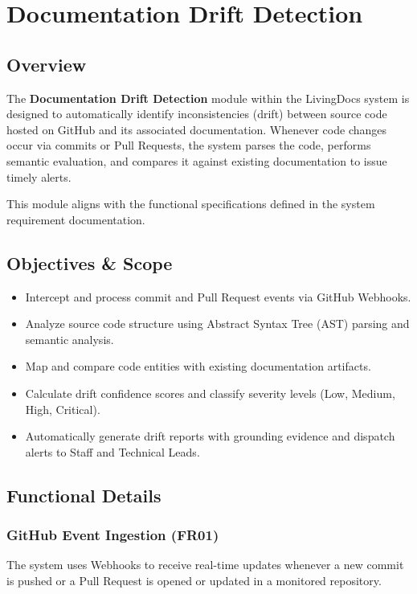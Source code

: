 \section{Documentation Drift Detection}

\subsection{Overview}
The \textbf{Documentation Drift Detection} module within the LivingDocs system is designed to automatically identify inconsistencies (drift) between source code hosted on GitHub and its associated documentation. Whenever code changes occur via commits or Pull Requests, the system parses the code, performs semantic evaluation, and compares it against existing documentation to issue timely alerts.

This module aligns with the functional specifications defined in the system requirement documentation.

\subsection{Objectives \& Scope}
\begin{itemize}
    \item Intercept and process commit and Pull Request events via GitHub Webhooks.
    \item Analyze source code structure using Abstract Syntax Tree (AST) parsing and semantic analysis.
    \item Map and compare code entities with existing documentation artifacts.
    \item Calculate drift confidence scores and classify severity levels (Low, Medium, High, Critical).
    \item Automatically generate drift reports with grounding evidence and dispatch alerts to Staff and Technical Leads.
\end{itemize}

\subsection{Functional Details}

\subsubsection{GitHub Event Ingestion (FR01)}
The system uses Webhooks to receive real-time updates whenever a new commit is pushed or a Pull Request is opened or updated in a monitored repository.

